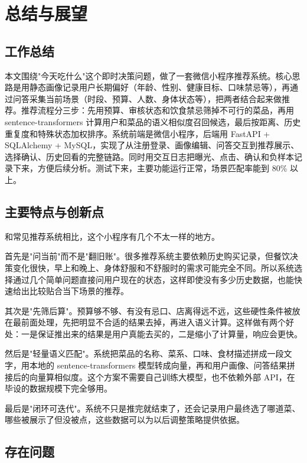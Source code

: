\chapter{总结与展望}

\section{工作总结}

本文围绕"今天吃什么"这个即时决策问题，做了一套微信小程序推荐系统。核心思路是用静态画像记录用户长期偏好（年龄、性别、健康目标、口味禁忌等），再通过问答采集当前场景（时段、预算、人数、身体状态等），把两者结合起来做推荐。推荐流程分三步：先用预算、审核状态和饮食禁忌筛掉不可行的菜品，再用 sentence-transformers 计算用户和菜品的语义相似度召回候选，最后按距离、历史重复度和特殊状态加权排序。系统前端是微信小程序，后端用 FastAPI + SQLAlchemy + MySQL，实现了从注册登录、画像编辑、问答交互到推荐展示、选择确认、历史回看的完整链路。同时用交互日志把曝光、点击、确认和负样本记录下来，方便后续分析。测试下来，主要功能运行正常，场景匹配率能到 80\% 以上。


\section{主要特点与创新点}

和常见推荐系统相比，这个小程序有几个不太一样的地方。

首先是"问当前"而不是"翻旧账"。很多推荐系统主要依赖历史购买记录，但餐饮决策变化很快，早上和晚上、身体舒服和不舒服时的需求可能完全不同。所以系统选择通过几个简单问题直接问用户现在的状态，这样即使没有多少历史数据，也能快速给出比较贴合当下场景的推荐。

其次是"先筛后算"。预算够不够、有没有忌口、店离得远不远，这些硬性条件被放在最前面处理，先把明显不合适的结果去掉，再进入语义计算。这样做有两个好处：一是保证推出来的结果是用户真能去买的，二是缩小了计算量，响应会更快。

然后是"轻量语义匹配"。系统把菜品的名称、菜系、口味、食材描述拼成一段文字，用本地的 sentence-transformers 模型转成向量，再和用户画像、问答结果拼接后的向量算相似度。这个方案不需要自己训练大模型，也不依赖外部 API，在毕设的数据规模下完全够用。

最后是"闭环可迭代"。系统不只是推完就结束了，还会记录用户最终选了哪道菜、哪些被展示了但没被点，这些数据可以为以后调整策略提供依据。

\section{存在问题}

